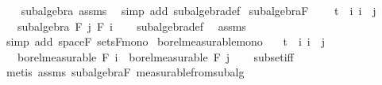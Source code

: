 \begin{isabellebody}
%
\isadelimproof
\ \ %
\endisadelimproof
%
\isatagproof
{}\isamarkupfalse%
\ subalgebra\ assms\ \isamarkupfalse%
\ {\isacharparenleft}{\kern0pt}simp\ add{\isacharcolon}{\kern0pt}\ subalgebra{\isacharunderscore}{\kern0pt}def{\isacharparenright}{\kern0pt}%
\endisatagproof
{\isafoldproof}%
%
\isadelimproof
\isanewline
%
\endisadelimproof
\isanewline
{}\isamarkupfalse%
\ subalgebra{\isacharunderscore}{\kern0pt}F{\isacharcolon}{\kern0pt}\ \isanewline
\ \ \ {\isachardoublequoteopen}t\ {\isasymle}\ i{\isachardoublequoteclose}\ {\isachardoublequoteopen}i\ {\isasymle}\ j{\isachardoublequoteclose}\isanewline
\ \ \ {\isachardoublequoteopen}subalgebra\ {\isacharparenleft}{\kern0pt}F\ j{\isacharparenright}{\kern0pt}\ {\isacharparenleft}{\kern0pt}F\ i{\isacharparenright}{\kern0pt}{\isachardoublequoteclose}\isanewline
%
\isadelimproof
\ \ %
\endisadelimproof
%
\isatagproof
{}\isamarkupfalse%
\ subalgebra{\isacharunderscore}{\kern0pt}def\ \isamarkupfalse%
\ assms\ \isamarkupfalse%
\ {\isacharparenleft}{\kern0pt}simp\ add{\isacharcolon}{\kern0pt}\ space{\isacharunderscore}{\kern0pt}F\ sets{\isacharunderscore}{\kern0pt}F{\isacharunderscore}{\kern0pt}mono{\isacharparenright}{\kern0pt}%
\endisatagproof
{\isafoldproof}%
%
\isadelimproof
\isanewline
%
\endisadelimproof
\isanewline
{}\isamarkupfalse%
\ borel{\isacharunderscore}{\kern0pt}measurable{\isacharunderscore}{\kern0pt}mono{\isacharcolon}{\kern0pt}\isanewline
\ \ \ {\isachardoublequoteopen}t\ {\isasymle}\ i{\isachardoublequoteclose}\ {\isachardoublequoteopen}i\ {\isasymle}\ j{\isachardoublequoteclose}\isanewline
\ \ \ {\isachardoublequoteopen}borel{\isacharunderscore}{\kern0pt}measurable\ {\isacharparenleft}{\kern0pt}F\ i{\isacharparenright}{\kern0pt}\ {\isasymsubseteq}\ borel{\isacharunderscore}{\kern0pt}measurable\ {\isacharparenleft}{\kern0pt}F\ j{\isacharparenright}{\kern0pt}{\isachardoublequoteclose}\isanewline
%
\isadelimproof
\ \ %
\endisadelimproof
%
\isatagproof
{}\isamarkupfalse%
\ subset{\isacharunderscore}{\kern0pt}iff\ \isamarkupfalse%
\ {\isacharparenleft}{\kern0pt}metis\ assms\ subalgebra{\isacharunderscore}{\kern0pt}F\ measurable{\isacharunderscore}{\kern0pt}from{\isacharunderscore}{\kern0pt}subalg{\isacharparenright}{\kern0pt}%
\endisatagproof
{\isafoldproof}%
%
\isadelimproof
\isanewline
%
\endisadelimproof
\isanewline
{}\isamarkupfalse%

\end{isabellebody}
